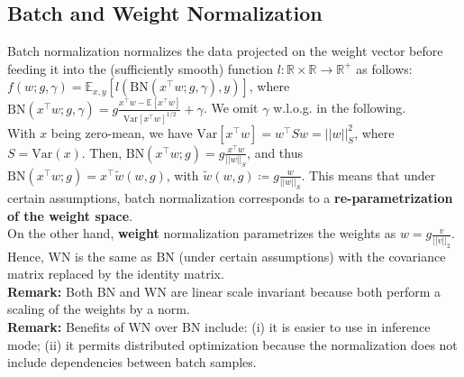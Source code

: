 \subsection{Batch and Weight Normalization}
Batch normalization normalizes the data projected on the weight vector before feeding it into the (sufficiently smooth) function $l:\mathbb{R} \times \mathbb{R} \to \mathbb{R}^+$ as follows: $f(w; g, \gamma) = \mathbb{E}_{x,y}[l\left(\text{BN}(x^\intercal w; g, \gamma), y\right)]$, where \\
$\text{BN}(x^\intercal w; g,\gamma ) = g \frac{x^\intercal w - \mathbb{E}[x^\intercal w]}{\text{Var}[x^\intercal w]^{1/2}} +\gamma$. We omit $\gamma$ w.l.o.g. in the following. \\
With $x$ being zero-mean, we have $\text{Var}[x^\intercal w]=w^\intercal Sw=||w||_S^2$, where $S=\text{Var}(x)$. Then, $\text{BN}(x^\intercal w;g)=g\frac{x^\intercal w}{||w||_S}$, and thus $\text{BN}(x^\intercal w; g)=x^\intercal \tilde{w}(w, g)$, with $\tilde{w}(w,g) \coloneqq g \frac{w}{||w||_S}$. This means that under certain assumptions, batch normalization corresponds to a \textbf{re-parametrization of the weight space}. \\
On the other hand, \textbf{weight} normalization parametrizes the weights as $w = g \frac{v}{||v||_2}$. Hence, WN is the same as BN (under certain assumptions) with the covariance matrix replaced by the identity matrix.\\
\textbf{Remark:} Both BN and WN are linear scale invariant because both perform a scaling of the weights by a norm. \\
\textbf{Remark:} Benefits of WN over BN include: (i) it is easier to use in inference mode; (ii) it permits distributed optimization because the normalization does not include dependencies between batch samples.